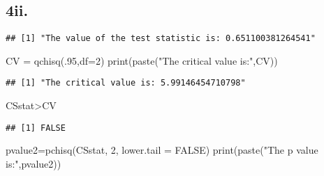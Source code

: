 \documentclass[
]{article}
\newenvironment{Shaded}{\begin{snugshade}}{\end{snugshade}}
\newcommand{\AttributeTok}[1]{\textcolor[rgb]{0.77,0.63,0.00}{#1}}
\newcommand{\ConstantTok}[1]{\textcolor[rgb]{0.00,0.00,0.00}{#1}}
\newcommand{\DecValTok}[1]{\textcolor[rgb]{0.00,0.00,0.81}{#1}}
\newcommand{\FunctionTok}[1]{\textcolor[rgb]{0.00,0.00,0.00}{#1}}
\newcommand{\NormalTok}[1]{#1}
\newcommand{\OtherTok}[1]{\textcolor[rgb]{0.56,0.35,0.01}{#1}}
\newcommand{\SpecialCharTok}[1]{\textcolor[rgb]{0.00,0.00,0.00}{#1}}
\newcommand{\StringTok}[1]{\textcolor[rgb]{0.31,0.60,0.02}{#1}}
\begin{document}
\hypertarget{ii.}{%
\subsection{4ii.}\label{ii.}}

\begin{Shaded}
\end{Shaded}

\begin{verbatim}
## [1] "The value of the test statistic is: 0.651100381264541"
\end{verbatim}

\begin{Shaded}
\begin{Highlighting}[]
\NormalTok{CV }\OtherTok{=} \FunctionTok{qchisq}\NormalTok{(.}\DecValTok{95}\NormalTok{,}\AttributeTok{df=}\DecValTok{2}\NormalTok{)}
\FunctionTok{print}\NormalTok{(}\FunctionTok{paste}\NormalTok{(}\StringTok{"The critical value is:"}\NormalTok{,CV))}
\end{Highlighting}
\end{Shaded}

\begin{verbatim}
## [1] "The critical value is: 5.99146454710798"
\end{verbatim}

\begin{Shaded}
\begin{Highlighting}[]
\NormalTok{CSstat}\SpecialCharTok{\textgreater{}}\NormalTok{CV}
\end{Highlighting}
\end{Shaded}

\begin{verbatim}
## [1] FALSE
\end{verbatim}

\begin{Shaded}
\begin{Highlighting}[]
\NormalTok{pvalue2}\OtherTok{=}\FunctionTok{pchisq}\NormalTok{(CSstat, }\DecValTok{2}\NormalTok{, }\AttributeTok{lower.tail =} \ConstantTok{FALSE}\NormalTok{)}
\FunctionTok{print}\NormalTok{(}\FunctionTok{paste}\NormalTok{(}\StringTok{"The p value is:"}\NormalTok{,pvalue2))}
\end{Highlighting}
\end{Shaded}
\end{document}
